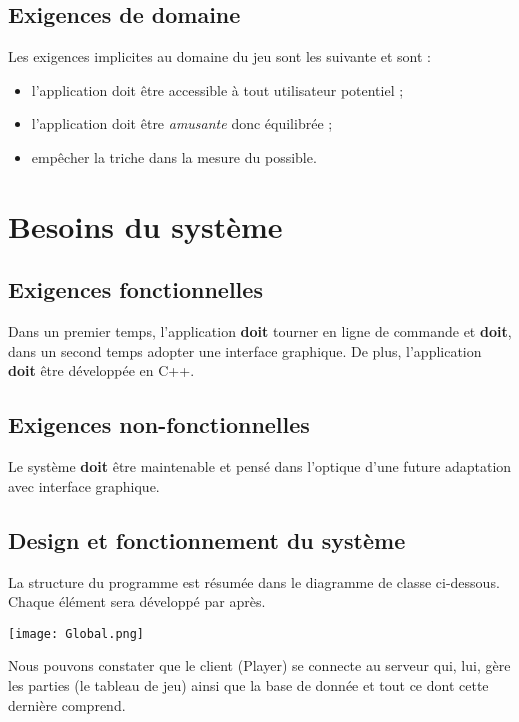 \documentclass{article}
\begin{document}
	\subsection{Exigences de domaine}
		Les exigences implicites au domaine du jeu sont les suivante et sont \textbf{} :

		\begin{itemize}
			\item l'application doit être accessible à tout utilisateur potentiel ;
			\item l'application doit être \textit{amusante} donc équilibrée ;
			\item empêcher la triche dans la mesure du possible.
		\end{itemize}

\newpage

\section{Besoins du système}
	\subsection{Exigences fonctionnelles}
		Dans un premier temps, l'application \textbf{doit} tourner en ligne de commande et \textbf{doit}, dans un second temps adopter une interface
		graphique. De plus, l'application \textbf{doit} être développée en C++.

	\subsection{Exigences non-fonctionnelles}
		Le système \textbf{doit} être maintenable et pensé dans l'optique d'une future adaptation avec interface graphique.

	\subsection{Design et fonctionnement du système}
		La structure du programme est résumée dans le diagramme de classe ci-dessous. Chaque élément sera développé par après.
		\begin{center}\texttt{[image: Global.png]}\end{center}

		Nous pouvons constater que le client (Player) se connecte au serveur qui, lui, gère les parties (le tableau de jeu) ainsi que la base de donnée et tout ce dont cette dernière comprend.
\end{document}
